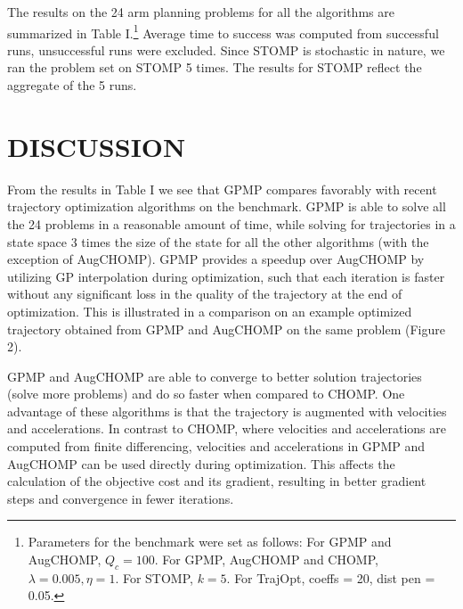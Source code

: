 \documentclass{IEEEtran}
\begin{document}
The results on the 24 arm planning problems for all the
algorithms are summarized in Table I.\footnote{Parameters for the benchmark were set as follows: For GPMP and
AugCHOMP, $Q_c=100$. For GPMP, AugCHOMP and CHOMP, $\lambda =
0.005, \eta = 1$. For STOMP, $k = 5$. For TrajOpt, coeffs = 20, dist pen
= 0.05.} Average time to
success was computed from successful runs, unsuccessful
runs were excluded. Since STOMP is stochastic in nature,
we ran the problem set on STOMP 5 times. The results for
STOMP reflect the aggregate of the 5 runs.
\section{DISCUSSION}
From the results in Table I we see that GPMP compares
favorably with recent trajectory optimization algorithms on
the benchmark. GPMP is able to solve all the 24 problems in
a reasonable amount of time, while solving for trajectories in
a state space 3 times the size of the state for all the other algorithms (with the exception of AugCHOMP). GPMP provides
a speedup over AugCHOMP by utilizing GP interpolation
during optimization, such that each iteration is faster without
any significant loss in the quality of the trajectory at the
end of optimization. This is illustrated in a comparison on
an example optimized trajectory obtained from GPMP and
AugCHOMP on the same problem (Figure 2).

GPMP and AugCHOMP are able to converge to better
solution trajectories (solve more problems) and do so faster
when compared to CHOMP. One advantage of these algorithms is that the trajectory is augmented with velocities and
accelerations. In contrast to CHOMP, where velocities and
accelerations are computed from finite differencing, velocities and accelerations in GPMP and AugCHOMP can be used
directly during optimization. This affects the calculation of
the objective cost and its gradient, resulting in better gradient
steps and convergence in fewer iterations.
\end{document}
